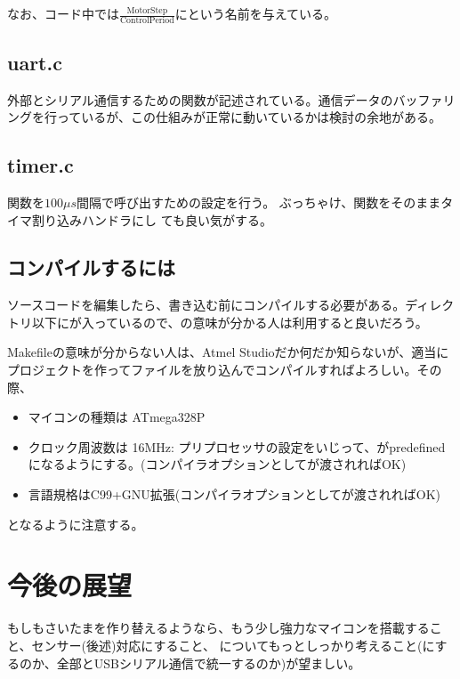 \documentclass[letterpaper,10pt,dvipdfmx]{sphinxmanual}
\begin{document}
なお、コード中では\(\frac{\mathrm{MotorStep}}{\mathrm{ControlPeriod}}\)にという名前を与えている。


\subsection{uart.c}
\label{\detokenize{nissyu-idohen/saitama:uart-c}}
外部とシリアル通信するための関数が記述されている。通信データのバッファリングを行っているが、この仕組みが正常に動いているかは検討の余地がある。


\subsection{timer.c}
\label{\detokenize{nissyu-idohen/saitama:timer-c}}
関数を\(100\mu s\)間隔で呼び出すための設定を行う。
ぶっちゃけ、関数をそのままタイマ割り込みハンドラにし
ても良い気がする。


\subsection{コンパイルするには}
\label{\detokenize{nissyu-idohen/saitama:id7}}
ソースコードを編集したら、書き込む前にコンパイルする必要がある。ディレクトリ以下にが入っているので、の意味が分かる人は利用すると良いだろう。

Makefileの意味が分からない人は、Atmel
Studioだか何だか知らないが、適当にプロジェクトを作ってファイルを放り込んでコンパイルすればよろしい。その際、
\begin{itemize}
\item {} 
マイコンの種類は ATmega328P

\item {} 
クロック周波数は 16MHz:
プリプロセッサの設定をいじって、がpredefinedになるようにする。(コンパイラオプションとしてが渡されればOK)

\item {} 
言語規格はC99+GNU拡張(コンパイラオプションとしてが渡されればOK)

\end{itemize}

となるように注意する。


\section{今後の展望}
\label{\detokenize{nissyu-idohen/saitama:id8}}
もしもさいたまを作り替えるようなら、もう少し強力なマイコンを搭載すること、センサー(後述)対応にすること、
についてもっとしっかり考えること(にするのか、全部とUSBシリアル通信で統一するのか)が望ましい。
\end{document}
